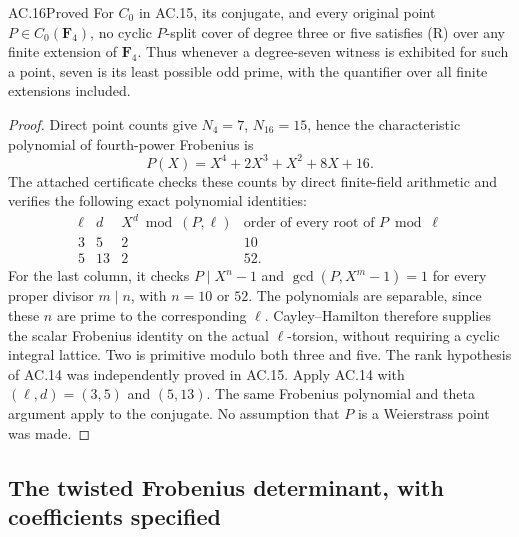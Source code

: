 \begin{claim}{AC.16}{Proved}
For $C_0$ in AC.15, its conjugate, and every original point
$P\in C_0(\mathbf F_4)$, no cyclic $P$-split cover of degree three or
five satisfies (R) over any finite extension of $\mathbf F_4$.
Thus whenever a degree-seven witness is exhibited for such a point,
seven is its least possible odd prime, with the quantifier over all
finite extensions included.
\end{claim}
\begin{proof}
Direct point counts give $N_4=7$, $N_{16}=15$, hence the characteristic
polynomial of fourth-power Frobenius is
\[
                  P(X)=X^4+2X^3+X^2+8X+16.
\]
The attached certificate checks these counts by direct finite-field
arithmetic and verifies the following exact polynomial identities:
\[
 \begin{array}{c|c|c|c}
 \ell&d&X^d\bmod(P,\ell)&
      \text{order of every root of }P\bmod\ell\\\hline
 3&5&2&10\\
 5&13&2&52.
 \end{array}
\]
For the last column, it checks $P\mid X^n-1$ and
$\gcd(P,X^m-1)=1$ for every proper divisor $m\mid n$, with
$n=10$ or $52$.  The polynomials are separable, since these $n$ are
prime to the corresponding $\ell$.  Cayley--Hamilton therefore supplies
the scalar Frobenius identity on the actual $\ell$-torsion, without
requiring a cyclic integral lattice.  Two is primitive modulo both three
and five.  The rank hypothesis of AC.14 was independently proved in
AC.15.  Apply AC.14 with $(\ell,d)=(3,5)$ and $(5,13)$.
The same Frobenius polynomial and theta argument apply to the conjugate.
No assumption that $P$ is a Weierstrass point was made.
\end{proof}

\subsection{The twisted Frobenius determinant, with coefficients specified}

